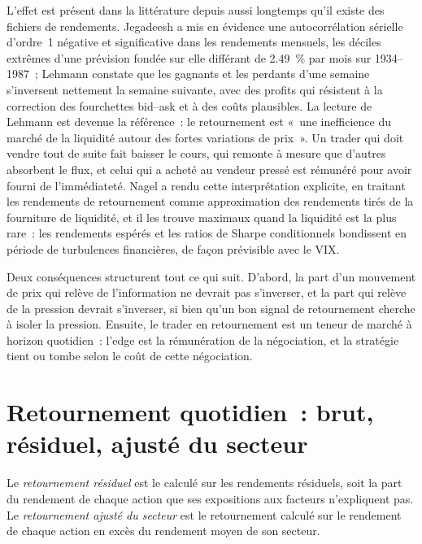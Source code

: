 L'effet est présent dans la littérature depuis aussi longtemps qu'il existe des fichiers de rendements. Jegadeesh a mis en évidence une autocorrélation sérielle d'ordre~1 négative et significative dans
les rendements mensuels, les déciles extrêmes d'une prévision fondée sur elle différant de 2.49~\% par mois sur 1934--1987~; Lehmann constate que les gagnants et les perdants d'une semaine
s'inversent nettement la semaine suivante, avec des profits qui résistent à la correction des fourchettes bid--ask et à des coûts plausibles. La lecture de Lehmann est devenue la référence~:
le retournement est «~une inefficience du marché de la liquidité autour des fortes variations de prix~». Un trader qui doit vendre tout de suite fait baisser le cours, qui
remonte à mesure que d'autres absorbent le flux, et celui qui a acheté au vendeur pressé est rémunéré pour avoir fourni de l'immédiateté. Nagel a rendu cette interprétation explicite, en traitant
les rendements de retournement comme approximation des rendements tirés de la fourniture de liquidité, et il les trouve maximaux quand la liquidité est la plus rare~: les rendements espérés et les
ratios de Sharpe conditionnels bondissent en période de turbulences financières, de façon prévisible avec le VIX.

Deux conséquences structurent tout ce qui suit. D'abord, la part d'un mouvement de prix qui relève de l'information ne devrait pas s'inverser, et la part qui relève de la pression devrait s'inverser, si bien qu'un bon
signal de retournement cherche à isoler la pression. Ensuite, le trader en retournement est un teneur de marché à horizon quotidien~: l'edge est la rémunération de la négociation, et la
stratégie tient ou tombe selon le coût de cette négociation.

\section{Retournement quotidien~: brut, résiduel, ajusté du secteur}

\begin{definition}\label{def:s1:short-term-reversal:residual}
Le \emph{retournement résiduel} est le  calculé sur les rendements résiduels, soit la part du rendement de chaque action que ses
expositions aux facteurs n'expliquent pas. Le \emph{retournement ajusté du secteur} est le retournement calculé sur le rendement de chaque action en excès du
rendement moyen de son secteur.
\end{definition}

